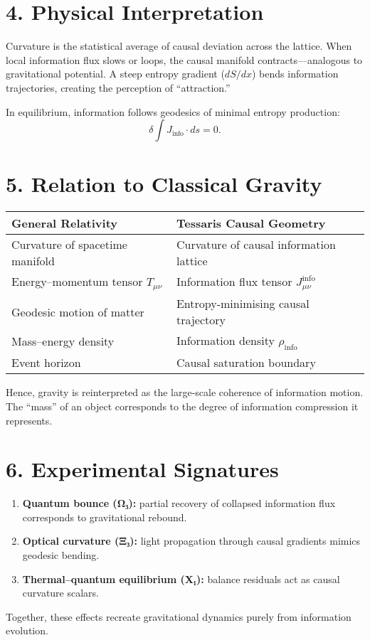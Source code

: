 \documentclass[11pt,a4paper]{article}
\begin{document}
\section{4. Physical Interpretation}
Curvature is the statistical average of causal deviation across the lattice.  
When local information flux slows or loops, the causal manifold contracts---analogous to gravitational potential.  
A steep entropy gradient (\(dS/dx\)) bends information trajectories, creating the perception of ``attraction.''

In equilibrium, information follows geodesics of minimal entropy production:
\[
\delta \int J_{\mathrm{info}} \cdot ds = 0.
\]

\section{5. Relation to Classical Gravity}
\begin{longtable}{|l|l|}
\hline
\textbf{General Relativity} & \textbf{Tessaris Causal Geometry} \\
\hline
Curvature of spacetime manifold & Curvature of causal information lattice \\
Energy--momentum tensor $T_{\mu\nu}$ & Information flux tensor $J_{\mu\nu}^{\mathrm{info}}$ \\
Geodesic motion of matter & Entropy-minimising causal trajectory \\
Mass--energy density & Information density $\rho_{\mathrm{info}}$ \\
Event horizon & Causal saturation boundary \\
\hline
\end{longtable}

Hence, gravity is reinterpreted as the large-scale coherence of information motion.  
The ``mass'' of an object corresponds to the degree of information compression it represents.

\section{6. Experimental Signatures}
\begin{enumerate}
\item \textbf{Quantum bounce (Ω₃):} partial recovery of collapsed information flux corresponds to gravitational rebound.  
\item \textbf{Optical curvature (Ξ₃):} light propagation through causal gradients mimics geodesic bending.  
\item \textbf{Thermal–quantum equilibrium (X₁):} balance residuals act as causal curvature scalars.  
\end{enumerate}
Together, these effects recreate gravitational dynamics purely from information evolution.
\end{document}
